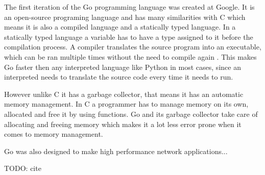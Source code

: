 The first iteration of the Go programming language was created at Google. It is an open-source programing language and has many similarities with C which means it is also a compiled language and a statically typed language. In a statically typed language a variable has to have a type assigned to it before the compilation process. A compiler translates the source program into an executable, which can be ran multiple times without the need to compile again \cite{Aho2006}. This makes Go faster then any interpreted language like Python in most cases, since an interpreted needs to translate the source code every time it needs to run.

However unlike C it has a garbage collector, that means it has an automatic memory management. In C a programmer has to manage memory on its own, allocated and free it by using functions. Go and its garbage collector take care of allocating and freeing memory which makes it a lot less error prone when it comes to memory management.

Go was also designed to make high performance network applications...

TODO: cite \cite{Donovan2016} \cite{Aho2006}